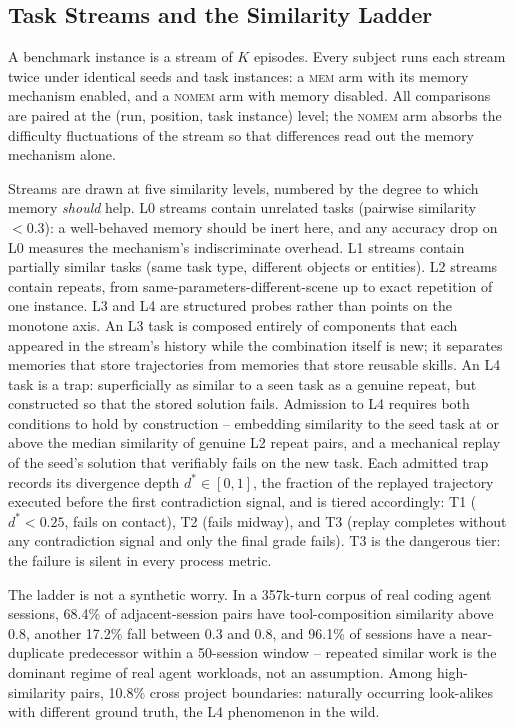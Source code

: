 \documentclass[11pt]{article}
\begin{document}
\subsection{Task Streams and the Similarity Ladder}
\label{sec:ladder}

A benchmark instance is a stream of $K$ episodes. Every subject runs each
stream twice under identical seeds and task instances: a \textsc{mem} arm
with its memory mechanism enabled, and a \textsc{nomem} arm with memory
disabled. All comparisons are paired at the (run, position, task instance)
level; the \textsc{nomem} arm absorbs the difficulty fluctuations of the
stream so that differences read out the memory mechanism alone.

Streams are drawn at five similarity levels, numbered by the degree to which
memory \emph{should} help. L0 streams contain unrelated tasks
(pairwise similarity $<0.3$): a well-behaved memory should be inert here, and
any accuracy drop on L0 measures the mechanism's indiscriminate overhead. L1
streams contain partially similar tasks (same task type, different objects or
entities). L2 streams contain repeats, from same-parameters-different-scene
up to exact repetition of one instance. L3 and L4 are structured probes
rather than points on the monotone axis. An L3 task is composed entirely of
components that each appeared in the stream's history while the combination
itself is new; it separates memories that store trajectories from memories
that store reusable skills. An L4 task is a trap: superficially as similar to
a seen task as a genuine repeat, but constructed so that the stored solution
fails. Admission to L4 requires both conditions to hold by construction --
embedding similarity to the seed task at or above the median similarity of
genuine L2 repeat pairs, and a mechanical replay of the seed's solution that
verifiably fails on the new task. Each admitted trap records its divergence
depth $d^\ast \in [0,1]$, the fraction of the replayed trajectory executed
before the first contradiction signal, and is tiered accordingly: T1
($d^\ast<0.25$, fails on contact), T2 (fails midway), and T3 (replay
completes without any contradiction signal and only the final grade fails).
T3 is the dangerous tier: the failure is silent in every process metric.

The ladder is not a synthetic worry. In a 357k-turn corpus of real coding
agent sessions, 68.4\% of adjacent-session pairs have tool-composition
similarity above 0.8, another 17.2\% fall between 0.3 and 0.8, and 96.1\% of
sessions have a near-duplicate predecessor within a 50-session window --
repeated similar work is the dominant regime of real agent workloads, not an
assumption. Among high-similarity pairs, 10.8\% cross project boundaries:
naturally occurring look-alikes with different ground truth, the L4
phenomenon in the wild.
\end{document}
